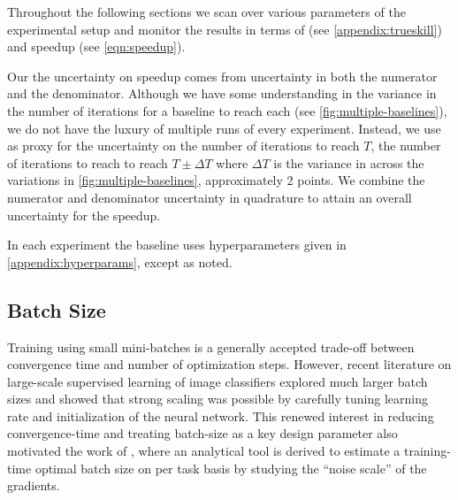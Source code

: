\documentclass[ocean-paper.tex]{subfiles}
\begin{document}
Throughout the following sections we scan over various parameters of the experimental setup and monitor the results in terms of \trueskillname (see \autoref{appendix:trueskill}) and speedup (see \autoref{eqn:speedup}).

Our the uncertainty on speedup comes from uncertainty in both the numerator and the denominator. 
Although we have some understanding in the variance in the number of iterations for a baseline to reach each \trueskillname (see \autoref{fig:multiple-baselines}), we do not have the luxury of multiple runs of every experiment.
Instead, we use as proxy for the uncertainty on the number of iterations to reach \trueskillname $T$, the number of iterations to reach to reach $T\pm\Delta T$ where $\Delta T$ is the variance in \trueskillname across the variations in \autoref{fig:multiple-baselines}, approximately 2 \trueskillname points.
We combine the numerator and denominator uncertainty in quadrature to attain an overall uncertainty for the speedup.

In each experiment the baseline uses hyperparameters given in \autoref{appendix:hyperparams}, except as noted.

\subsection{Batch Size}\label{sec:methods:batchsize}



Training using small mini-batches is a generally accepted trade-off between convergence time and number of optimization steps. 
However, recent literature on large-scale supervised learning of image classifiers \cite{Goyal2017Imagenet, You2017Imagenet, You2018minutenet} explored much larger batch sizes and showed that strong scaling was possible by carefully tuning learning rate and initialization of the neural network. 
This renewed interest in reducing convergence-time and treating batch-size as a key design parameter also motivated the work of \cite{mccandlish2018empirical}, where an analytical tool is derived to estimate a training-time optimal batch size on per task basis by studying the ``noise scale'' of the gradients.
\end{document}
